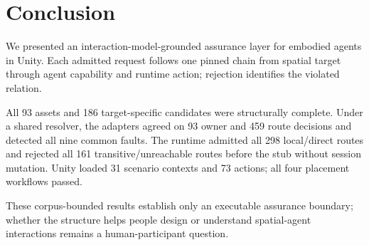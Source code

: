 \section{Conclusion}

We presented an interaction-model-grounded assurance layer for embodied agents
in Unity. Each admitted request follows one pinned chain from spatial target
through agent capability and runtime action; rejection identifies the violated
relation.

All 93 assets and 186 target-specific candidates were structurally complete.
Under a shared resolver, the adapters agreed on 93 owner and 459 route
decisions and detected all nine common faults. The runtime admitted all 298
local/direct routes and rejected all 161 transitive/unreachable routes before
the stub without session mutation. Unity loaded 31 scenario contexts and 73
actions; all four placement workflows passed.

These corpus-bounded results establish only an executable assurance boundary;
whether the structure helps people design or understand spatial-agent
interactions remains a human-participant question.
